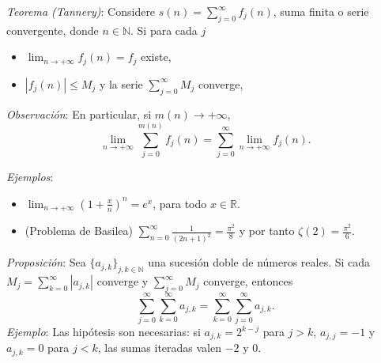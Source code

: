 \documentclass{beamer}
\begin{document}
  \begin{frame}
    \textit{Teorema (Tannery)}: Considere $s(n) = \sum_{j=0}^{\infty} f_j(n)$, suma
    finita o serie convergente, donde $n \in \mathbb{N}$. Si para cada $j$
    \begin{itemize}[<+->]
      \item $\lim_{n \to +\infty} f_j(n) = f_j$ existe,
      \item $|f_j(n)| \leq M_j$ y la serie $\sum_{j=0}^{\infty} M_j$ converge,
    \end{itemize}
    \newline\newline
    \pause

    \textit{Observación}: En particular, si $m(n) \to +\infty$,
    \[
      \lim_{n \to +\infty} \sum_{j=0}^{m(n)} f_j(n) = \sum_{j=0}^{\infty} \lim_{n \to +\infty} f_j(n).
    \]
  \end{frame}

  \begin{frame}
    \textit{Ejemplos}:
    \begin{itemize}[<+->]
      \item $\lim_{n \to +\infty} \left( 1 + \frac{x}{n} \right)^n = e^x$, para
        todo $x \in \mathbb{R}$.
      \item (Problema de Basilea)
        $\sum_{n=0}^{\infty} \frac{1}{(2n+1)^2} = \frac{\pi^2}{8}$ y por tanto
        $\zeta(2) = \frac{\pi^2}{6}$.
    \end{itemize}
    \vspace{0.3cm}
    \pause

    \textit{Proposición}: Sea $\{a_{j,k}\}_{j,k \in \mathbb{N}}$ una sucesión doble
    de números reales. Si cada $M_j = \sum_{k=0}^{\infty} |a_{j,k}|$ converge y
    $\sum_{j=0}^{\infty} M_j$ converge, entonces
    \[
      \sum_{j=0}^{\infty} \sum_{k=0}^{\infty} a_{j,k} = \sum_{k=0}^{\infty} \sum_{j=0}^{\infty} a_{j,k}.
    \]
    \pause
    \textit{Ejemplo}: Las hipótesis son necesarias: si $a_{j,k} = 2^{k-j}$ para
    $j > k$, $a_{j,j} = -1$ y $a_{j,k} = 0$ para $j < k$, las sumas iteradas
    valen $-2$ y $0$.
  \end{frame}
\end{document}
